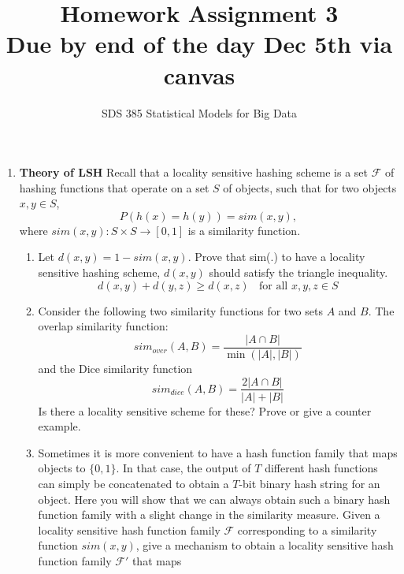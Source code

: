 \documentclass[11pt]{article}
\begin{document}
\title{{\bf Homework Assignment 3\\
Due by end of the day Dec 5th via canvas}}
\author{SDS 385 Statistical Models for Big Data}

\date{}

\maketitle{}
\begin{enumerate}
\item \textbf{Theory of LSH}
Recall that a locality sensitive hashing scheme is a set $\mathcal{F}$ of hashing functions that operate on a set $S$ of objects, such that for two objects $x, y \in S$,
$$P(h(x)=h(y))=sim(x,y),$$
where $sim(x,y):	S\times S\rightarrow [0,1]$ is a similarity function.
\begin{enumerate}
	\item Let $d(x,y)=1-sim(x,y)$. Prove that sim(.) to have a locality sensitive hashing scheme, $d(x,y)$ should satisfy the triangle inequality.
	$$d(x,y)+d(y,z)\geq d(x,z)\ \ \ \ \mbox{for all }x,y,z\in S$$
	\item Consider the following two similarity functions for two sets $A$ and $B$. The overlap similarity function:
	$$sim_{over}(A,B)=\frac{|A\cap B|}{\min(|A|,|B|)}$$
	and the Dice similarity function
	$$sim_{dice}(A,B)=\frac{2|A\cap B|}{|A|+|B|}$$
	Is there a locality sensitive scheme for these? Prove or give a counter example.
\item Sometimes it is more convenient to have a hash function family that maps objects to $\{0, 1\}$. In that case, the output of $T$ different hash functions can simply be concatenated to obtain a $T$-bit binary hash string for an object. Here you will show that we can always obtain such a binary hash function family with a slight change in the similarity measure. Given a locality sensitive hash function family $\mathcal{F}$ corresponding to a similarity function $sim(x,y)$, give a mechanism to obtain a locality sensitive hash function family $\mathcal{F}'$ that maps

\end{enumerate}
\end{enumerate}
\end{document}
